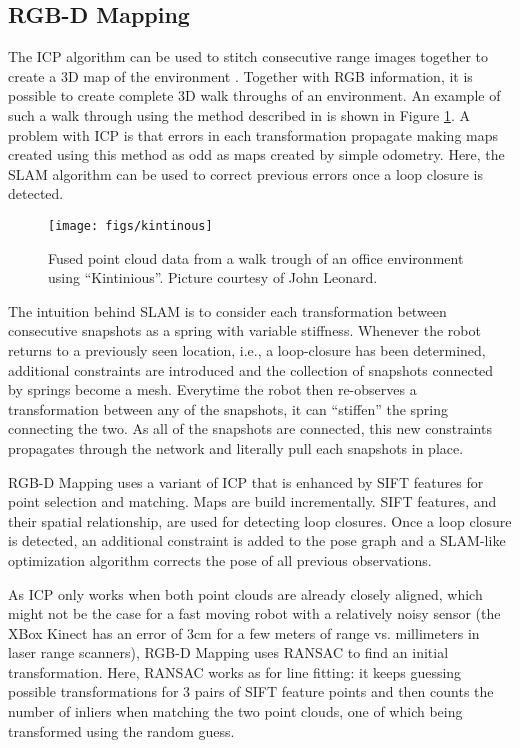 \subsection{RGB-D Mapping}
The ICP algorithm can be used to stitch consecutive range images together to create a 3D map of the environment \cite{henry2010rgb}. Together with RGB information, it is possible to create complete 3D walk throughs of an environment. An example of such a walk through using the method described in \cite{whelan2013robust} is shown in Figure \ref{fig:kintinous}.
A problem with ICP is that errors in each transformation propagate making maps created using this method as odd as maps created by simple odometry. Here, the SLAM algorithm can be used to correct previous errors once a loop closure is detected.

\begin{figure}
\centering
\texttt{[image: figs/kintinous]}
\caption{Fused point cloud data from a walk trough of an office environment using ``Kintinious''. Picture courtesy of John Leonard.\label{fig:kintinous}}
\end{figure}

The intuition behind SLAM is to consider each transformation between consecutive snapshots as a spring with variable stiffness. Whenever the robot returns to a previously seen location, i.e., a loop-closure has been determined, additional constraints are introduced and the collection of snapshots connected by springs become a mesh. Everytime the robot then re-observes a transformation between any of the snapshots, it can ``stiffen'' the spring connecting the two. As all of the snapshots are connected, this new constraints propagates through the network and literally pull each snapshots in place.

RGB-D Mapping uses a variant of ICP that is enhanced by SIFT features for point selection and matching. Maps are build incrementally. SIFT features, and their spatial relationship, are used for detecting loop closures. Once a loop closure is detected, an additional constraint is added to the pose graph and a SLAM-like optimization algorithm corrects the pose of all previous observations.

As ICP only works when both point clouds are already closely aligned, which might not be the case for a fast moving robot with a relatively noisy sensor (the XBox Kinect has an error of 3cm for a few meters of range vs. millimeters in laser range scanners), RGB-D Mapping uses RANSAC to find an initial transformation. Here, RANSAC works as for line fitting: it keeps guessing possible transformations for 3 pairs of SIFT feature points and then counts the number of inliers when matching the two point clouds, one of which being transformed using the random guess.

